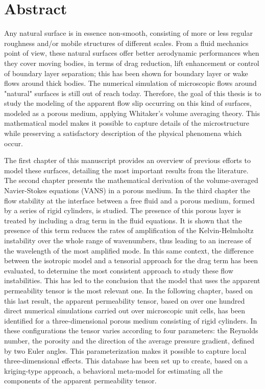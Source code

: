 \chapter*{Abstract}

Any natural surface is in essence non-smooth, consisting of more or less regular roughness and/or mobile structures of different scales. From a fluid mechanics point of view, these natural surfaces offer better aerodynamic performances when they cover moving bodies, in terms of drag reduction, lift enhancement or control of boundary layer separation; this has been shown for boundary layer or wake flows around thick bodies. The numerical simulation of microscopic flows around "natural" surfaces is still out of reach today. Therefore, the goal of this thesis is to study the modeling of the apparent flow slip occurring on this kind of surfaces, modeled as a porous medium, applying Whitaker's volume averaging theory. This mathematical model makes it possible to capture details of the microstructure while preserving a satisfactory description of the physical phenomena which occur. 

The first chapter of this manuscript provides an overview of previous efforts to model these surfaces, detailing the most important results from the literature. The second chapter presents the mathematical derivation of the volume-averaged Navier-Stokes equations (VANS) in a porous medium. In the third chapter the flow stability at the interface between a free fluid and a porous medium, formed by a series of rigid cylinders, is studied. The presence of this porous layer is treated by including a drag term in the fluid equations. It is shown that the presence of this term reduces the rates of amplification of the Kelvin-Helmholtz instability over the whole range of wavenumbers, thus leading to an increase of the wavelength of the most amplified mode. In this same context, the difference between the isotropic model and a tensorial approach for the drag term has been evaluated, to determine the most consistent approach to study these flow instabilities. This has led to the conclusion that the model that uses the apparent permeability tensor is the most relevant one. In the following chapter, based on this last result, the apparent permeability tensor, based on over one hundred direct numerical simulations carried out over microscopic unit cells, has been identified for a three-dimensional porous medium consisting of rigid cylinders. In these configurations the tensor varies according to four parameters: the Reynolds number, the porosity and the direction of the average pressure gradient, defined by two Euler angles. This parameterization makes it possible to capture local three-dimensional effects. This database has been set up to create, based on a kriging-type approach, a behavioral meta-model for estimating all the components of the apparent permeability tensor.

